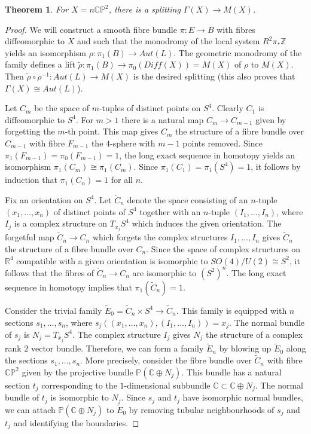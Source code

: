 \documentclass{amsart}
\newtheorem{theorem}{Theorem}[section]
\theoremstyle{definition}
\theoremstyle{remark}
\numberwithin{equation}{section}
\begin{document}
\begin{theorem}\label{thm:split}
For $X = n \mathbb{CP}^2$, there is a splitting $\Gamma(X) \to M(X)$.
\end{theorem}
\begin{proof}
We will construct a smooth fibre bundle $\pi : E \to B$ with fibres diffeomorphic to $X$ and such that the monodromy of the local system $R^2 \pi_* \mathbb{Z}$ yields an isomorphism $\rho : \pi_1(B) \to Aut(L)$. The geometric monodromy of the family defines a lift $\widetilde{\rho} : \pi_1(B) \to \pi_0(Diff(X)) = M(X)$ of $\rho$ to $M(X)$. Then $\widetilde{\rho} \circ \rho^{-1} : Aut(L) \to M(X)$ is the desired splitting (this also proves that $\Gamma(X) \cong Aut(L)$).

Let $C_m$ be the space of $m$-tuples of distinct points on $S^4$. Clearly $C_1$ is diffeomorphic to $S^4$. For $m > 1$ there is a natural map $C_m \to C_{m-1}$ given by forgetting the $m$-th point. This map gives $C_m$ the structure of a fibre bundle over $C_{m-1}$ with fibre $F_{m-1}$ the $4$-sphere with $m-1$ points removed. Since $\pi_1(F_{m-1}) = \pi_0(F_{m-1}) = 1$, the long exact sequence in homotopy yields an isomorphism $\pi_1( C_{m}) \cong \pi_1(C_m)$. Since $\pi_1(C_1) = \pi_1(S^4) = 1$, it follows by induction that $\pi_1(C_n) = 1$ for all $n$.

Fix an orientation on $S^4$. Let $\widetilde{C}_n$ denote the space consisting of an $n$-tuple $(x_1 , \dots , x_n)$ of distinct points of $S^4$ together with an $n$-tuple $(I_1 , \dots , I_n)$, where $I_j$ is a complex structure on $T_{x_j} S^4$ which induces the given orientation. The forgetful map $\widetilde{C}_n \to C_n$ which forgets the complex structures $I_1, \dots , I_n$ gives $\widetilde{C}_n$ the structure of a fibre bundle over $C_n$. Since the space of complex structures on $\mathbb{R}^4$ compatible with a given orientation is isomorphic to $SO(4)/U(2) \cong S^2$, it follows that the fibres of $\widetilde{C}_n \to C_n$ are isomorphic to $(S^2)^n$. The long exact sequence in homotopy implies that $\pi_1( \widetilde{C}_n) = 1$.

Consider the trivial family $\widetilde{E}_0 = \widetilde{C}_n \times S^4 \to \widetilde{C}_n$. This family is equipped with $n$ sections $s_1, \dots , s_n$, where $s_j( (x_1 , \dots , x_n) , (I_1 , \dots , I_n)) = x_j$. The normal bundle of $s_j$ is $N_j = T_{x_j} S^4$. The complex structure $I_j$ gives $N_j$ the structure of a complex rank $2$ vector bundle. Therefore, we can form a family $\widetilde{E}_n$ by blowing up $\widetilde{E}_0$ along the sections $s_1, \dots , s_n$. More precisely, consider the fibre bundle over $\widetilde{C}_n$ with fibre $\mathbb{CP}^2$ given by the projective bundle $\mathbb{P}( \mathbb{C} \oplus N_j)$. This bundle has a natural section $t_j$ corresponding to the $1$-dimensional subbundle $\mathbb{C} \subset \mathbb{C} \oplus N_j$. The normal bundle of $t_j$ is isomorphic to $N_j$. Since $s_j$ and $t_j$ have isomorphic normal bundles, we can attach $\mathbb{P}(\mathbb{C} \oplus N_j)$ to $\widetilde{E}_0$ by removing tubular neighbourhoods of $s_j$ and $t_j$ and identifying the boundaries.


\end{proof}
\end{document}
